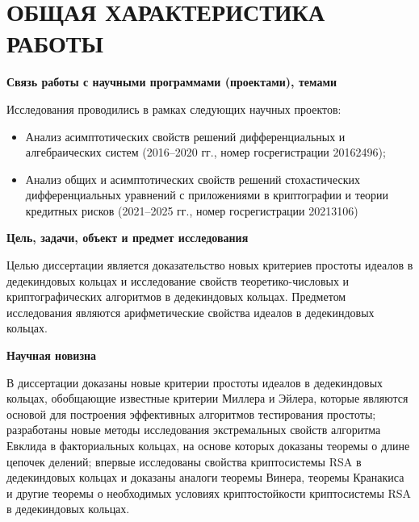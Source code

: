 \documentclass[_00_dissertation.tex]{subfiles}
\begin{document}
\onlyinsubfile{
    \renewcommand{\contentsname}{ОГЛАВЛЕНИЕ}
    \setcounter{tocdepth}{3}
    \tableofcontents
}

\chapter*{\MakeUppercase{Общая характеристика работы}}

\begin{center}
\textbf{Связь работы с научными программами (проектами), темами}
\end{center}

Исследования проводились в рамках следующих научных проектов:
\begin{itemize}
    \item Анализ асимптотических свойств решений дифференциальных и алгебраических систем (2016--2020 гг., номер госрегистрации 20162496);

    \item Анализ общих и асимптотических свойств решений стохастических дифференциальных уравнений с приложениями в криптографии и теории кредитных рисков (2021--2025 гг., номер госрегистрации 20213106)
\end{itemize}

\begin{center}
\textbf{Цель, задачи, объект и предмет исследования}
\end{center}

Целью диссертации является доказательство новых критериев простоты идеалов в дедекиндовых кольцах и исследование свойств теоретико-числовых и криптографических алгоритмов в дедекиндовых кольцах.
Предметом исследования являются арифметические свойства идеалов в дедекиндовых кольцах.

\begin{center}
\textbf{Научная новизна}
\end{center}

В диссертации доказаны новые критерии простоты идеалов в дедекиндовых кольцах, обобщающие известные критерии Миллера и Эйлера, которые являются основой для построения эффективных алгоритмов тестирования простоты;
разработаны новые методы исследования экстремальных свойств алгоритма Евклида в факториальных кольцах, на основе которых доказаны теоремы о длине цепочек делений;
впервые исследованы свойства криптосистемы RSA в дедекиндовых кольцах и доказаны аналоги теоремы Винера, теоремы Кранакиса и другие теоремы о необходимых условиях криптостойкости криптосистемы RSA в дедекиндовых кольцах.
\end{document}

